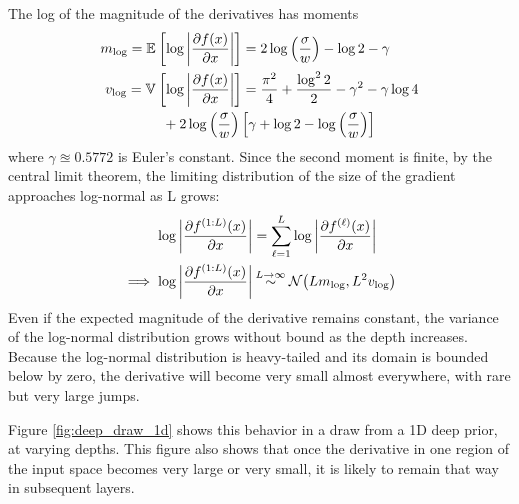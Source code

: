 \documentclass[twoside]{article}
\makeatletter
\newlength{\nonHumbleHeight}
\def\@humbleformat#1{{\settoheight{\nonHumbleHeight}{#1}\resizebox{!}{0.94\nonHumbleHeight}{#1}}}%
\newcommand\humble[1]{{\@humbleformat{#1}}}%
\newcommand{\gp}{{\humble{GP}}}
\newcommand{\lengthscale}{w}
\newcommand{\layerindex}{\ell}
\makeatother
\begin{document}
The log of the magnitude of the derivatives has moments
\begin{align}
m_{\log} = \expectargs{}{\log \left| \frac{\partial f(x)}{\partial x} \right|} & = 2 \log \left( \frac{\sigma}{\lengthscale} \right) - \log2 - \gamma \nonumber \\
v_{\log} = \varianceargs{}{\log \left| \frac{\partial f(x)}{\partial x} \right|} & = \frac{\pi^2}{4} + \frac{\log^2 2}{2}  - \gamma^2 - \gamma \log4 \nonumber \\
& \hspace{-2cm} + 2 \log\left(\frac{\sigma}{\lengthscale}\right) \left[ \gamma + \log2 - \log \left(\frac{\sigma}{\lengthscale}\right) \right]
\end{align}
where $\gamma \approxeq 0.5772$ is Euler's constant.  Since the second moment is finite, by the central limit theorem, the limiting distribution of the size of the gradient approaches log-normal as L grows:
\begin{align}
\log \left| \frac{\partial f^{(1:L)}(x)}{\partial x} \right| 
& = \sum_{\layerindex=1}^L \log \left| \frac{\partial f^{(\layerindex)}(x)}{\partial x} \right| \nonumber \\
 \implies
\log \left| \frac{\partial f^{(1:L)}(x)}{\partial x} \right| & \distas{L \rightarrow \infty} \Nt{ L m_{\log} }{L^2 v_{\log}}
\end{align}
%
Even if the expected magnitude of the derivative remains constant, the variance of the log-normal distribution grows without bound as the depth increases.  Because the log-normal distribution is heavy-tailed and its domain is bounded below by zero, the derivative will become very small almost everywhere, with rare but very large jumps.  

Figure \ref{fig:deep_draw_1d} shows this behavior in a draw from a 1D deep \gp{} prior, at varying depths.  This figure also shows that once the derivative in one region of the input space becomes very large or very small, it is likely to remain that way in subsequent layers.
%
\end{document}
